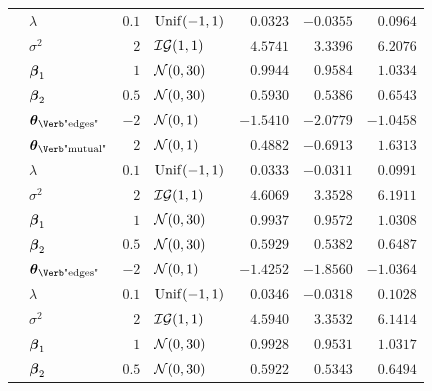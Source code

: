 \begin{table}[t]
\begin{tabular}{cl|rlrrr}
        & $\lambda$                        & $0.1$ & $\mathrm{Unif}(-1,1)$       & $0.0323$  & $-0.0355$ & $0.0964$  \\
        & $\sigma^2$                       & $2$   & $\mathcal{IG}(1,1)$   & $4.5741$  & $3.3396$  & $6.2076$  \\
        & $\boldsymbol{\beta}_{1}$                     & $1$   & $\mathcal{N}(0,30)$        & $0.9944$  & $0.9584$  & $1.0334$  \\
        & $\boldsymbol{\beta}_{2}$                     & $0.5$ & $\mathcal{N}(0,30)$        & $0.5930$  & $0.5386$  & $0.6543$  \\
        & $\ttheta_{\text{\Verb"edges"}}$  & $-2$  & $\mathcal{N}(0,1)$  & $-1.5410$ & $-2.0779$ & $-1.0458$ \\
        & $\ttheta_{\text{\Verb"mutual"}}$ & $2$   & $\mathcal{N}(0,1)$  & $0.4882$  & $-0.6913$ & $1.6313$  \\
		\midrule
        & $\lambda$                        & $0.1$ & $\mathrm{Unif}(-1,1)$       & $0.0333$  & $-0.0311$ & $0.0991$  \\
        & $\sigma^2$                       & $2$   & $\mathcal{IG}(1,1)$   & $4.6069$  & $3.3528$  & $6.1911$  \\
        & $\boldsymbol{\beta}_{1}$                     & $1$   & $\mathcal{N}(0,30)$        & $0.9937$  & $0.9572$  & $1.0308$  \\
        & $\boldsymbol{\beta}_{2}$                     & $0.5$ & $\mathcal{N}(0,30)$        & $0.5929$  & $0.5382$  & $0.6487$  \\
        & $\ttheta_{\text{\Verb"edges"}}$  & $-2$  & $\mathcal{N}(0,1)$  & $-1.4252$ & $-1.8560$ & $-1.0364$ \\
		\midrule
        & $\lambda$                        & $0.1$ & $\mathrm{Unif}(-1,1)$       & $0.0346$  & $-0.0318$ & $0.1028$  \\
        & $\sigma^2$                       & $2$   & $\mathcal{IG}(1,1)$   & $4.5940$  & $3.3532$  & $6.1414$  \\
        & $\boldsymbol{\beta}_{1}$                     & $1$   & $\mathcal{N}(0,30)$        & $0.9928$  & $0.9531$  & $1.0317$  \\
        & $\boldsymbol{\beta}_{2}$                     & $0.5$ & $\mathcal{N}(0,30)$        & $0.5922$  & $0.5343$  & $0.6494$  \\

\end{tabular}
\end{table}
